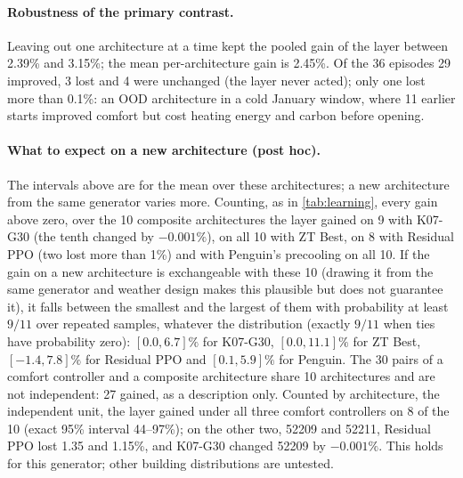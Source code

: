 \paragraph{Robustness of the primary contrast.} Leaving out one architecture at a time kept the pooled gain of the layer
between 2.39\% and 3.15\%; the mean per-architecture gain is 2.45\%. Of the 36 episodes 29 improved, 3 lost and 4 were
unchanged (the layer never acted); only one lost more than 0.1\%: an OOD architecture in a cold January window, where 11
earlier starts improved comfort but cost heating energy and carbon before opening.

\paragraph{What to expect on a new architecture (post hoc).} The intervals above are for the mean over these architectures; a
new architecture from the same generator varies more. Counting, as in \cref{tab:learning}, every gain
above zero, over the 10 composite architectures the layer gained on 9 with K07-G30 (the tenth changed by $-0.001\%$), on all
10 with ZT Best, on 8 with Residual PPO (two lost more than 1\%) and with Penguin's precooling on all 10. If the gain on a new architecture is exchangeable with these 10 (drawing it from the same generator and weather design makes
this plausible but does not guarantee it), it falls between the smallest and the largest of them with probability at least
$9/11$ over repeated samples, whatever the distribution (exactly $9/11$ when ties have probability zero):
$[0.0, 6.7]\%$ for K07-G30, $[0.0, 11.1]\%$ for ZT Best, $[-1.4, 7.8]\%$ for Residual PPO and $[0.1, 5.9]\%$ for Penguin. The
30 pairs of a comfort controller and a composite architecture share 10 architectures and are not independent: 27 gained, as a
description only. Counted by architecture, the independent unit, the layer gained under all three comfort controllers on 8 of
the 10 (exact 95\% interval 44--97\%); on the other two, 52209 and 52211, Residual PPO lost 1.35 and 1.15\%, and K07-G30
changed 52209 by $-0.001\%$. This holds for this generator;
other building distributions are untested.

